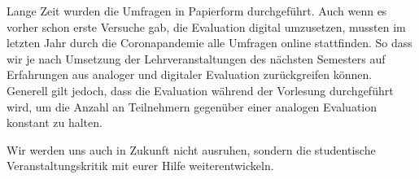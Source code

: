 \begin{multicols}{2}
Lange Zeit wurden die Umfragen in Papierform durchgeführt. Auch wenn es vorher schon erste Versuche gab, die Evaluation digital umzusetzen, mussten im letzten Jahr durch die Coronapandemie alle Umfragen online stattfinden. So dass wir je nach Umsetzung der Lehrveranstaltungen des nächsten Semesters auf Erfahrungen aus analoger und digitaler Evaluation zurückgreifen können. Generell gilt jedoch, dass die Evaluation während der Vorlesung durchgeführt wird, um die Anzahl an Teilnehmern gegenüber einer analogen Evaluation konstant zu halten.

Wir werden uns auch in Zukunft nicht ausruhen, sondern die studentische Veranstaltungskritik mit eurer Hilfe weiterentwickeln.

\end{multicols}

